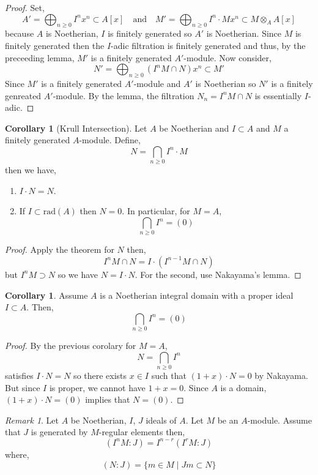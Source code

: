 \documentclass[12pt]{article}
\newcommand{\rad}[1]{\mathrm{rad}\left( #1 \right)}
\theoremstyle{remark}
\newtheorem*{remark}{Remark}
\theoremstyle{definition}
\newtheorem{corollary}[theorem]{Corollary}
\begin{document}
\begin{proof}
Set,
\[ A' = \bigoplus_{n \ge 0} I^n x^n \subset A[x] \quad \text{and} \quad M' = \bigoplus_{n \ge 0} I^n \cdot M x^n \subset M \otimes_A A[x]\]
because $A$ is Noetherian, $I$ is finitely generated so $A'$ is Noetherian. Since $M$ is finitely generated then the $I$-adic filtration is finitely generated and thus, by the preceeding lemma, $M'$ is a finitely generated $A'$-module. Now consider,
\[ N' = \bigoplus_{n \ge 0}(I^n M \cap N) x^n \subset M' \]
Since $M'$ is a finitely generated $A'$-module and $A'$ is Noetherian so $N'$ is a finitely genreated $A'$-module. By the lemma, the filtration $N_n = I^n M \cap N$ is essentially $I$-adic. 
\end{proof}

\begin{corollary}[Krull Intersection]
Let $A$ be Noetherian and $I \subset A$ and $M$ a finitely generated $A$-module. Define,
\[ N = \bigcap_{n \ge 0} I^n \cdot M \]
then we have,
\begin{enumerate}
\item $I \cdot N = N$.
\item
If $I \subset \rad{A}$ then $N = 0$. In particular, for $M = A$,
\[ \bigcap_{n \ge 0} I^n = (0) \]
\end{enumerate}
\end{corollary}

\begin{proof}
Apply the theorem for $N$ then,
\[ I^n M \cap N = I \cdot \left(I^{n-1} M \cap N \right) \]
but $I^n M \supset N$ so we have $N = I \cdot N$. For the second, use Nakayama's lemma.
\end{proof}

\begin{corollary}
Assume $A$ is a Noetherian integral domain with a proper ideal $I \subset A$. Then,
\[ \bigcap_{n \ge 0} I^n  = (0) \]
\end{corollary}

\begin{proof}
By the previous corolary for $M = A$,
\[ N = \bigcap_{n \ge 0} I^n \]
satisfies $I \cdot N = N$ so there exists $x \in I$ such that $(1 + x) \cdot N = 0$ by Nakayama. But since $I$ is proper, we cannot have $1 + x = 0$. Since $A$ is a domain, $(1 + x) \cdot N = (0)$ implies that $N = (0)$. 
\end{proof}

\begin{remark}
Let $A$ be Noetherian, $I$, $J$ ideals of $A$. Let $M$ be an $A$-module. Assume that $J$ is generated by $M$-regular elements then,
\[ (I^n M : J) = I^{n - r} (I^r M : J ) \]
where,
\[ (N : J) = \{m \in M \mid J m \subset N \} \] 
\end{remark}
\end{document}
